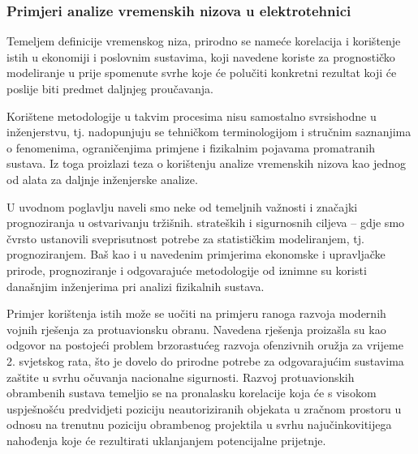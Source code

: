 \documentclass[a4paper,12pt,oneside]{memoir}
\begin{document}
            \subsubsection{Primjeri analize vremenskih nizova u elektrotehnici}
                Temeljem definicije vremenskog niza, prirodno se nameće korelacija i korištenje istih u ekonomiji i poslovnim sustavima, koji navedene koriste za prognostičko modeliranje u prije spomenute svrhe koje će polučiti konkretni rezultat koji će poslije biti predmet daljnjeg proučavanja.

                Korištene metodologije u takvim procesima nisu samostalno svrsishodne u inženjerstvu, tj. nadopunjuju se tehničkom terminologijom i stručnim saznanjima o fenomenima, ograničenjima primjene i fizikalnim pojavama promatranih sustava. Iz toga proizlazi teza o korištenju analize vremenskih nizova kao jednog od alata za daljnje inženjerske analize.


                U uvodnom poglavlju naveli smo neke od temeljnih važnosti i značajki prognoziranja u ostvarivanju tržišnih. strateških i sigurnosnih ciljeva -- gdje smo čvrsto ustanovili sveprisutnost potrebe za statističkim modeliranjem, tj. prognoziranjem. Baš kao i u navedenim primjerima ekonomske i upravljačke prirode, prognoziranje i odgovarajuće metodologije od iznimne su koristi današnjim inženjerima pri analizi fizikalnih sustava. 
                
                Primjer korištenja istih može se uočiti na primjeru ranoga razvoja modernih vojnih rješenja za protuavionsku obranu. Navedena rješenja proizašla su kao odgovor na postojeći problem brzorastućeg razvoja ofenzivnih oružja za vrijeme 2. svjetskog rata, što je dovelo do prirodne potrebe za odgovarajućim sustavima zaštite u svrhu očuvanja nacionalne  sigurnosti. Razvoj protuavionskih obrambenih sustava temeljio se na pronalasku korelacije koja će s visokom uspješnošću predvidjeti poziciju neautoriziranih objekata u zračnom prostoru u odnosu na trenutnu poziciju obrambenog projektila u svrhu najučinkovitijega nahođenja koje će rezultirati uklanjanjem potencijalne prijetnje.
                
\end{document}

